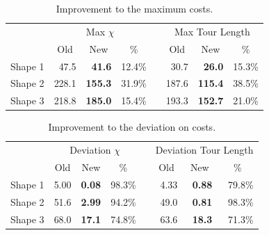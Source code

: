 \documentclass[../main.tex]{subfiles}
\begin{document}
\begin{table}
	\centering
	\caption{Improvement to the maximum costs.}
	\label{table:decomposition_improvement_max}
	\begin{tabular}{@{}l rrrrrrr}
		\toprule
		& \multicolumn{3}{c}{Max $\chi$} && \multicolumn{3}{c}{Max Tour Length} \\
		\cmidrule{2-4} \cmidrule{6-8}
		& \multicolumn{1}{c}{Old} & \multicolumn{1}{c}{New} & \multicolumn{1}{c}{\%} & & \multicolumn{1}{c}{Old} & \multicolumn{1}{c}{New} & \multicolumn{1}{c}{\%}  \\
		\cmidrule{1-8}
		Shape 1 & 47.5 & \bf{41.6}   & 12.4\% && 30.7  & \bf{26.0}  & 15.3\% \\
		Shape 2 & 228.1 & \bf{155.3} & 31.9\% && 187.6 & \bf{115.4} & 38.5\% \\
		Shape 3 & 218.8 & \bf{185.0} & 15.4\% && 193.3 & \bf{152.7} & 21.0\% \\
		\bottomrule

	\end{tabular}
\end{table}

\begin{table}
	\centering
	\caption{Improvement to the deviation on costs.}
	\label{table:decomposition_improvement_deviation}
	\begin{tabular}{@{}l rrrrrrr}
		\toprule
		& \multicolumn{3}{c}{Deviation $\chi$} && \multicolumn{3}{c}{Deviation Tour Length} \\
		\cmidrule{2-4} \cmidrule{6-8}
		& \multicolumn{1}{c}{Old} & \multicolumn{1}{c}{New} & \multicolumn{1}{c}{\%} & & \multicolumn{1}{c}{Old} & \multicolumn{1}{c}{New} & \multicolumn{1}{c}{\%}  \\
		\cmidrule{1-8}
		Shape 1 & 5.00 & \bf{0.08} & 98.3\% && 4.33 & \bf{0.88} & 79.8\% \\
		Shape 2 & 51.6 & \bf{2.99} & 94.2\% && 49.0 & \bf{0.81} & 98.3\% \\
		Shape 3 & 68.0 & \bf{17.1} & 74.8\% && 63.6 & \bf{18.3} & 71.3\% \\
		\bottomrule

	\end{tabular}
\end{table}
\end{document}
